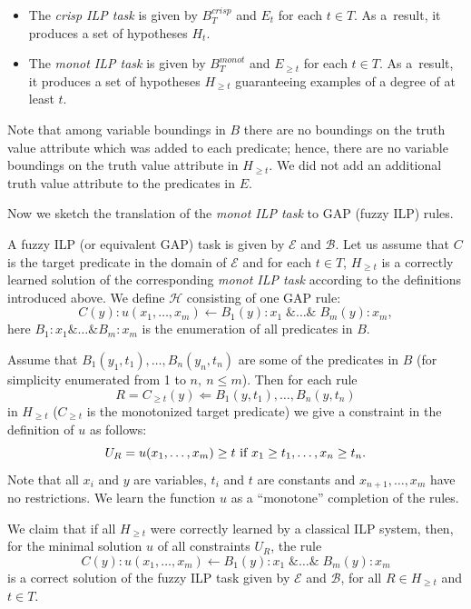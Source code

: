 \begin{itemize}
	\item The \textit{crisp ILP task} is given by $B^{crisp}_{T}$ and $E_t$ for each $t\in T$.  As a~result, it produces a set of hypotheses $H_t$.

	\item The \textit{monot ILP task} is given by ${B}^{monot}_T$ and $E_{\ge t}$ for each $t\in T$. As a~result, it produces a set of hypotheses $H_{\ge t}$ guaranteeing examples of a degree of at least $t$.
\end{itemize}

Note that among variable boundings in $B$ there are no boundings on the truth value attribute which was added to each predicate; hence, there are no variable boundings on the truth value attribute in $H_{\ge t}$. We did not add an additional truth value attribute to the predicates in $E$. 

Now we sketch the translation of the \emph{monot ILP task} to GAP (fuzzy ILP) rules. 

\begin{theorem}
A fuzzy ILP (or equivalent GAP) task is given by ${\mathcal E}$ and ${\mathcal B}$. Let us assume that $C$ is the target predicate in the domain of ${\mathcal E}$ and for each $t \in T$, $H_{\ge t}$ is a correctly learned solution of the corresponding \textit{monot ILP task} according to the definitions introduced above. We define ${\mathcal H}$ consisting of one GAP rule:
$$C(y):u(x_1,\dots,x_m)\leftarrow B_1(y):x_1\; \&\dots\& \;B_m(y):x_m,$$
here $B_1:x_1 \&\dots\& B_m:x_m$ is the enumeration of all predicates in $B$.

Assume that $B_1(y_1,t_1),\dots,B_n(y_n,t_n)$ are some of the predicates in $B$ (for simplicity enumerated from 1 to $n, \ n \le m$). Then for each rule 
$$
R=C_{\ge t}(y)\Leftarrow B_1(y,t_1),\dots,B_n(y,t_n)
$$
in $H_{\ge t}$ ($C_{\ge t}$ is the monotonized target predicate) we give a constraint in the definition of $u$ as follows:
$$
U_R=u(x_1,\dots,x_m)\ge t \hbox{ if }x_1\ge t_1,\dots,x_n\ge t_n.
$$
Note that all $x_i$ and $y$ are variables, $t_i$ and $t$ are constants and $x_{n+1},\dots,x_m$ have no restrictions.
We learn the function $u$ as a ``monotone'' completion of the rules. 

We claim that if all $H_{\ge t}$ were correctly learned by a classical ILP system, then, for the minimal solution $u$ of all constraints $U_R$, the rule
$$
C(y):u(x_1,\dots,x_m)\leftarrow B_1(y):x_1\; \&\dots\& \;B_m(y):x_m
$$
is a correct solution of the fuzzy ILP task given by ${\mathcal E}$ and ${\mathcal B}$, for all $R\in H_{\ge t}$ and $t\in T$. 
\end{theorem}



